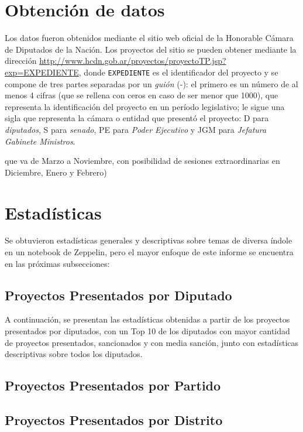 \documentclass[12pt,a4paper,titlepage]{article}
\begin{document}
  \section{Obtención de datos}\label{section:data}

  Los datos fueron obtenidos mediante el sitio web oficial de la Honorable Cámara
  de Diputados de la Nación.  Los proyectos del sitio se pueden obtener
  mediante la dirección
  \url{http://www.hcdn.gob.ar/proyectos/proyectoTP.jsp?exp=EXPEDIENTE}, donde
  {\tt EXPEDIENTE} es el identificador del proyecto y se compone de tres partes
  separadas por un {\em guión} (-): el primero es un número de al menos 4
  cifras (que se rellena con ceros en caso de ser menor que 1000), que
  representa la identificación del proyecto en un período legislativo; le sigue
  una sigla que representa la cámara o entidad que presentó el proyecto: D para
  {\em diputados}, S para {\em senado}, PE para {\em Poder Ejecutivo} y JGM
  para {\em Jefatura Gabinete Ministros}.
  
  que va de Marzo a Noviembre, con posibilidad de sesiones extraordinarias en
  Diciembre, Enero y Febrero)

  \section{Estadísticas}\label{section:statistics}
  
  Se obtuvieron estadísticas generales y descriptivas sobre temas de diversa índole en un notebook de Zeppelin, pero el mayor enfoque de este informe se encuentra en las próximas subsecciones:
  
  
  \subsection{Proyectos Presentados por Diputado}
  A continuación, se presentan las estadísticas obtenidas a partir de los proyectos presentados por diputados, con un Top 10 de los diputados con mayor cantidad de proyectos presentados, sancionados y con media sanción, junto con estadísticas descriptivas sobre todos los diputados.
  
  
  \subsection{Proyectos Presentados por Partido}
  
  \subsection{Proyectos Presentados por Distrito}
  
\end{document}
